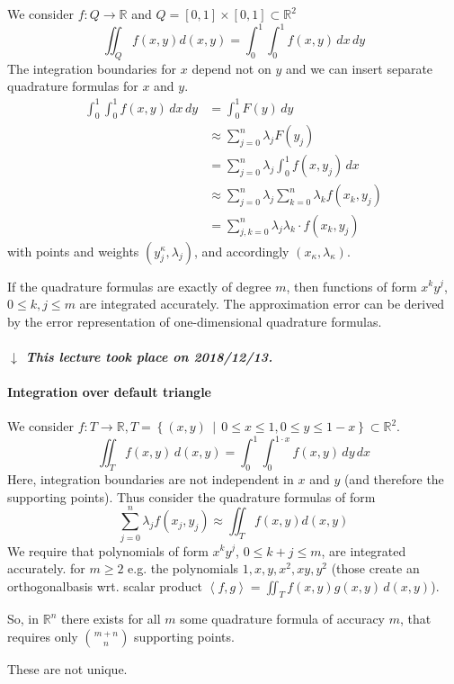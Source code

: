\documentclass[a4paper]{article}
\numberwithin{lecref}{section}
\theoremstyle{break}
\newcommand{\dateref}[1]{%
  \begin{mdframed}[backgroundcolor=gray!10,innerbottommargin=0pt,innertopmargin=0pt]
    \paragraph{\textit{$\downarrow$ This lecture took place on #1.}}%
  \end{mdframed}%
}
\newcommand{\SetDef}[2]{\left\{#1\,\mid\,#2\right\}}
\newcommand{\IP}[2]{\left\langle#1, #2\right\rangle}
\begin{document}
We consider $f: Q \to \mathbb R$ and $Q = [0, 1] \times [0, 1] \subset \mathbb R^2$
\[ \iint_{Q} f(x, y) d(x, y) = \int_0^1 \int_0^1 f(x, y) \, dx \, dy \]
The integration boundaries for $x$ depend not on $y$ and we can insert separate quadrature formulas for $x$ and $y$.
\begin{align*}
  \int_0^1 \int_0^1 f(x, y) \, dx \, dy
    &= \int_0^1 F(y) \, dy \\
    &\approx \sum_{j=0}^n \lambda_j F(y_j) \\
    &= \sum_{j=0}^n \lambda_j \int_0^1 f(x, y_j) \, dx \\
    &\approx \sum_{j=0}^n \lambda_j \sum_{k=0}^n \lambda_k f(x_k, y_j) \\
    &= \sum_{j,k=0}^n \lambda_j \lambda_k \cdot f(x_k, y_j)
\end{align*}
with points and weights $(y_j^\kappa, \lambda_j)$, and accordingly $(x_\kappa, \lambda_\kappa)$.

If the quadrature formulas are exactly of degree $m$, then functions of form $x^k y^j$, $0 \leq k, j \leq m$ are integrated accurately. The approximation error can be derived by the error representation of one-dimensional quadrature formulas.

\dateref{2018/12/13}

\paragraph{Integration over default triangle}

We consider $f: T \to \mathbb R, T = \SetDef{(x,y)}{0 \leq x \leq 1, 0 \leq y \leq 1 - x} \subset \mathbb R^2$.
\[ \iint_T f(x, y) \, d(x,y) = \int_0^1 \int_0^{1\cdot x} f(x, y) \, dy \, dx \]
Here, integration boundaries are not independent in $x$ and $y$ (and therefore the supporting points).
Thus consider the quadrature formulas of form
\[ \sum_{j=0}^n \lambda_j f(x_j, y_j) \approx \iint_T f(x, y) d(x, y)  \]
We require that polynomials of form $x^k y^j$, $0 \leq k + j \leq m$, are integrated accurately. for $m \geq 2$ e.g. the polynomials $1, x, y, x^2, xy, y^2$ (those create an orthogonalbasis wrt. scalar product $\IP{f}{g} = \iint_T f(x, y) g(x, y) \, d(x, y)$).

So, in $\mathbb R^n$ there exists for all $m$ some quadrature formula of accuracy $m$, that requires only ${m+n \choose n}$ supporting points.

These are not unique.
\end{document}
